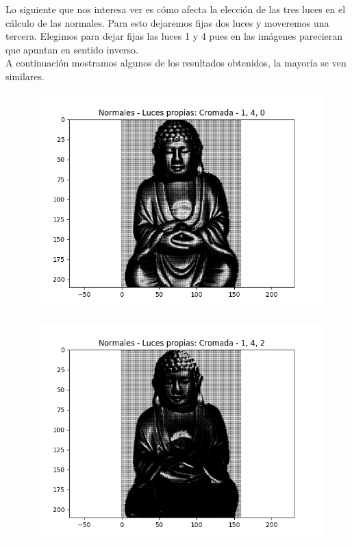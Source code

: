 Lo siguiente que nos interesa ver es cómo afecta la elección de las tres luces en el cálculo de las normales. Para esto dejaremos fijas dos luces y moveremos una tercera. Elegimos para dejar fijas las luces 1 y 4 pues en las imágenes parecieran que apuntan en sentido inverso. \\

A continuación mostramos algunos de los resultados obtenidos, la mayoría se ven similares. \\

\begin{figure}[H]
\centering
\begin{minipage}{.5\textwidth}
  \centering
  \includegraphics[width=1\linewidth]{informe/imagenes/normales/normalesBuda140.png}
\end{minipage}%
\begin{minipage}{.5\textwidth}
  \centering
  \includegraphics[width=1\linewidth]{informe/imagenes/normales/normalesBuda142.png}
  \label{fig:normalesluz2}
\end{minipage}
\end{figure}

